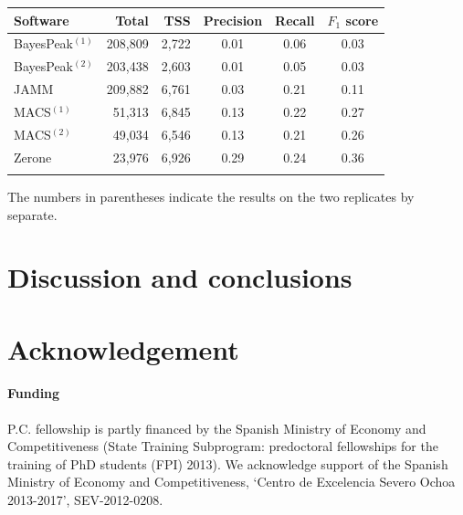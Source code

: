 \documentclass{bioinfo}
\begin{document}
\begin{table}[!t]
{\begin{tabular}{lrrccc}
        \toprule
        \textbf{Software}  & \textbf{Total}  & \textbf{TSS} &
        \textbf{Precision} & \textbf{Recall} & \textbf{$F_{1}$ score} \\
        \midrule
        BayesPeak$^{(1)}$ & 208,809 & 2,722 & 0.01 & 0.06 & 0.03 \\
        BayesPeak$^{(2)}$ & 203,438 & 2,603 & 0.01 & 0.05 & 0.03 \\
        JAMM              & 209,882 & 6,761 & 0.03 & 0.21 & 0.11 \\
        MACS$^{(1)}$      &  51,313 & 6,845 & 0.13 & 0.22 & 0.27 \\
        MACS$^{(2)}$      &  49,034 & 6,546 & 0.13 & 0.21 & 0.26 \\
        Zerone            &  23,976 & 6,926 & 0.29 & 0.24 & 0.36 \\
        \botrule
\end{tabular}}{The numbers in parentheses indicate the results on the two
replicates by separate.}
\end{table}

\section{Discussion and conclusions}

\section*{Acknowledgement}

\paragraph{Funding\textcolon}
P.C. fellowship is partly financed by the Spanish Ministry of Economy and
Competitiveness (State Training Subprogram: predoctoral fellowships for the
training of PhD students (FPI) 2013).
We acknowledge support of the Spanish Ministry of Economy and Competitiveness,
`Centro de Excelencia Severo Ochoa 2013-2017', SEV-2012-0208.



\end{document}
